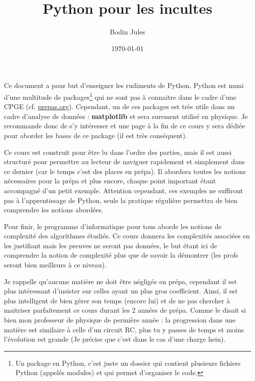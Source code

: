 \documentclass[a4paper,12pt]{article}
\title{Python pour les incultes}
\author{Bodin Jules}
\date{\today}
\begin{document}
\maketitle

\newpage

Ce document a pour but d'enseigner les rudiments de Python. Python est muni d'une multitude de packages\footnote{Un package en Python, 
c’est juste un dossier qui contient plusieurs fichiers Python (appelés modules) et qui permet d’organiser le code. 
} qui ne sont pas à connaitre dans le cadre d'une CPGE (cf. \href{https://prepas.org/ups.php?rubrique=53}{prepas.org}). 
Cependant, un de ces packages est très utile dans un cadre d'analyse de données : \textbf{matplotlib} et sera surement utilisé en physique. 
Je recommande donc de s'y intéresser et une page à la fin de ce cours y sera dédiée pour aborder les bases de ce package 
(il est très conséquent).

Ce cours est construit pour être lu dans l'ordre des parties, mais il est aussi structuré pour permettre au lecteur de naviguer rapidement
et simplement dans ce dernier (car le temps c'est des places en prépa).
Il abordera toutes les notions nécessaires pour la prépa et plus encore, chaque point important étant accompagné d'un petit exemple. Attention cependant,
ces exemples ne suffiront pas à l'apprentissage de Python, seule la pratique régulière permettra de bien comprendre les notions abordées.

Pour finir, le programme d'informatique pour tous aborde les notions de complexité des algorithmes étudiés. Ce cours donnera les complexités associées en les 
justifiant mais les preuves ne seront pas données, le but étant ici de comprendre la notion de complexité plus que de savoir la démontrer
(les profs seront bien meilleurs à ce niveau).

Je rappelle qu'aucune matière ne doit être négligée en prépa, cependant il est plus intéressant d'insister sur celles ayant un plus gros coefficient. 
Ainsi, il est plus intelligent de bien gérer son temps (encore lui) et de ne pas chercher à maitriser parfaitement ce cours durant les 2 années de prépa. 
Comme le disait si bien mon professeur de physique de permière année : la progression dans une matière est similaire à celle d'un circuit RC,
plus tu y passes de temps et moins l'évolution est grande (Je précise que c'est dans le cas d'une charge hein).
\end{document}
